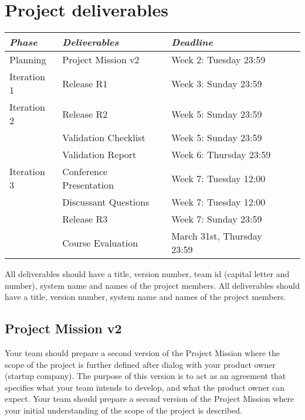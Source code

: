 \ifteknolog
\newcommand{\ITERATIONTHREE}{
 Iteration 3 & Conference Presentation & Week 7: Tuesday 12:00\\
      & Discussant Questions & Week 7: Tuesday 12:00\\
      & Release R3 & Week 7: Sunday 23:59\\
}
\else
\newcommand{\ITERATIONTHREE}{
    Iteration 3 & Release R3 & Week 7: Sunday 23:59\\
}
\fi

\section{Project deliverables}
\begin{tabular}{l |l p{5cm}  l}
{\it Phase} & {\it Deliverables} & {\it Deadline} \\
\hline
Planning & Project Mission v2& Week 2: Tuesday 23:59\\
Iteration 1 & Release R1 & Week 3: Sunday 23:59 \\
Iteration 2 & Release R2  & Week 5: Sunday 23:59\\
   & Validation Checklist & Week 5: Sunday 23:59\\
   & Validation Report & Week 6: Thursday 23:59\\
\ITERATIONTHREE
& Course Evaluation & March 31st, Thursday 23:59  \\

\end{tabular}
\vskip3mm

\ifteknolog
   \noindent All deliverables should have a title, version number, team id (capital letter and number), system name and names of the project members.
\else
   \noindent All deliverables should have a title, version number, system name and names of the project members.
\fi

\subsection{Project Mission v2}
\ifteknolog
   Your team should prepare a second version of the Project Mission where the scope of the project is further defined after dialog with your product owner (startup company). The purpose of this version is to act as an agreement that specifies what your team intends to develop, and what the product owner can expect.
\else
   Your team should prepare a second version of the Project Mission where your initial understanding of the scope of the project is described. 
\fi

